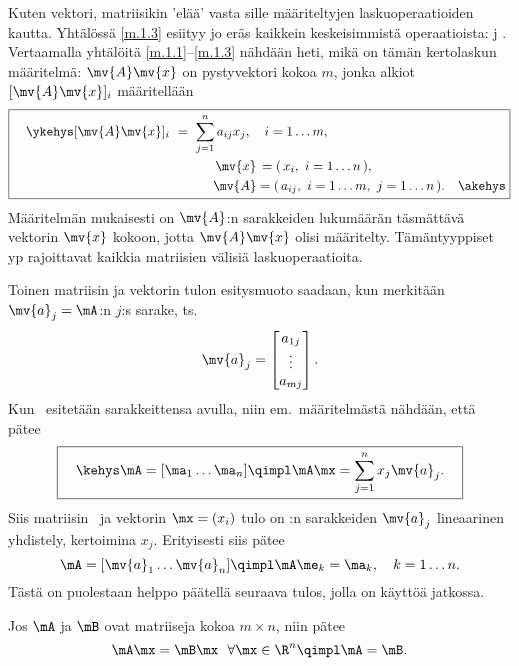 Kuten vektori, matriisikin 'elää' vasta sille määriteltyjen laskuoperaatioiden kautta. Yhtälössä
\eqref{m.1.3} esiityy jo eräs kaikkein keskeisimmistä operaatioista:
%
 j  . Vertaamalla yhtälöitä
\eqref{m.1.1}--\eqref{m.1.3} nähdään heti, mikä on tämän kertolaskun määritelmä: $\mv{A}\mv{x}$
on pystyvektori kokoa $m$, jonka alkiot $[\mv{A}\mv{x}]_i$ määritellään
\[ 
\boxed{ \begin{aligned} \quad \ykehys [\mv{A}\mv{x}]_i\ 
    &=\ \sum_{j=1}^n a_{ij} x_j, \quad i = 1 \ldots m, \\
    &\qquad\quad \,\mv{x}\,= (\,x_i,\ i = 1 \ldots n\,), \\
    &\qquad\quad \mv{A}  = (\,a_{ij},\ i = 1 \ldots m,\ j = 1 \ldots n\,). \quad\akehys \\
        \end{aligned} } 
\]
Määritelmän mukaisesti on $\mv{A}$:n sarakkeiden lukumäärän täsmättävä vektorin $\mv{x}$ kokoon,
jotta $\mv{A}\mv{x}$ olisi määritelty. Tämäntyyppiset y\pain{hteenso}p\pain{ivuusehdot}
rajoittavat kaikkia matriisien välisiä laskuoperaatioita.

Toinen matriisin ja vektorin tulon esitysmuoto saadaan, kun merkitään $\mv{a}_j = \mA$:n $j$:s
sarake, ts.
\[ 
\mv{a}_j = \begin{bmatrix} a_{1j} \\ \vdots \\ a_{mj} \end{bmatrix}. 
\]
Kun \mA\ esitetään sarakkeittensa avulla, niin em.\ määritelmästä nähdään, että pätee
\[ 
\boxed{ \quad\kehys\mA = [\ma_1 \ldots \ma_n] \qimpl \mA\mx = \sum_{j=1}^n x_j \mv{a}_j. \quad}
\]
Siis matriisin \mA\ ja vektorin $\mx = (x_i)$ tulo on \mA:n sarakkeiden $\mv{a}_j$ 
lineaarinen yhdistely, kertoimina $x_j$. Erityisesti siis pätee 
\[
\mA = [\mv{a}_1 \ldots \mv{a}_n ] \qimpl \mA\me_k=\ma_k, \quad k=1 \ldots n.
\]
Tästä on puolestaan helppo päätellä seuraava tulos, jolla on käyttöä jatkossa.
\begin{Prop} \label{matriisien yhtäsuuruus} Jos $\mA$ ja $\mB$ ovat matriiseja kokoa 
$m \times n$, niin pätee
\[
\mA\mx=\mB\mx\ \ \forall \mx\in\R^n \qimpl \mA=\mB.
\]
\end{Prop}

